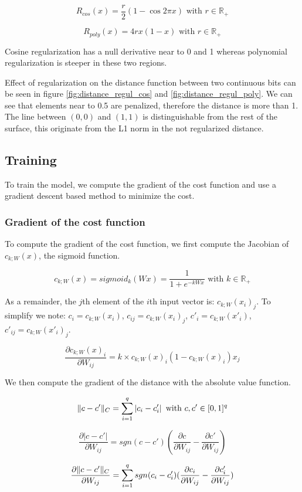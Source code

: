 \[R_{cos}(x) = \frac{r}{2}(1-\cos{2\pi x}) \text{ with } r \in \mathbb{R}_{+}\]

\[R_{poly}(x) = 4rx(1-x) \text{ with } r \in \mathbb{R}_{+}\]

Cosine regularization has a null derivative near to 0 and 1 whereas polynomial regularization is steeper in these two regions.

Effect of regularization on the distance function between two continuous bits can be seen in figure \ref{fig:distance_regul_cos} and \ref{fig:distance_regul_poly}. We can see that elements near to 0.5 are penalized, therefore the distance is more than 1. The line between $(0, 0)$ and $(1, 1)$ is distinguishable from the rest of the surface, this originate from the L1 norm in the not regularized distance.

\subsection{Training}
To train the model, we compute the gradient of the cost function and use a gradient descent based method to minimize the cost.

\subsubsection{Gradient of the cost function}
To compute the gradient of the cost function, we first compute the Jacobian of $c_{k;W}(x)$, the sigmoid function.

\[c_{k;W}(x) = sigmoid_k(Wx) = \frac{1}{1 + e^{-kWx}} \text{ with } k \in \mathbb{R}_+\]

As a remainder, the $j$th element of the $i$th input vector is: $c_{k;W}(x_i)_j$. To simplify we note: $c_i = c_{k;W}(x_i)$, $c_{ij} = c_{k;W}(x_i)_j$, $c'_i = c_{k;W}(x'_i)$, $c'_{ij} = c_{k;W}(x'_i)_j$.

\[\frac{\partial c_{k;W}(x)_i}{\partial W_{ij}} = k \times c_{k;W}(x)_i(1 - c_{k;W}(x)_i)x_j\]

We then compute the gradient of the distance with the absolute value function.

\[\lVert c - c'\rVert_{C} = \sum\limits_{i=1}^q \left|c_i-c'_i\right| \text{ with } c, c' \in [0, 1]^{q}\]

\[\frac{\partial \left|c-c'\right|}{\partial W_{ij}} = sgn(c-c')(\frac{\partial c}{\partial W_{ij}} - \frac{\partial c'}{\partial W_{ij}})\]

\[\frac{\partial \lVert c - c'\rVert_{C}}{\partial W_{ij}} = \sum\limits_{i=1}^q sgn(c_i-c'_i)(\frac{\partial c_i}{\partial W_{ij}} - \frac{\partial c'_i}{\partial W_{ij}})\]

